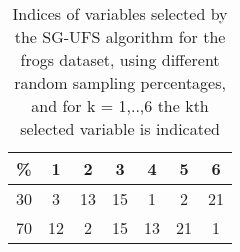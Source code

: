 \begin{table}
	\begin{center}
		\begin{tabular}{c c c c c c c}
			\% & 1 & 2 & 3 & 4 & 5 & 6 \\
			\hline
			30 & 3 & 13 & 15 & 1 & 2 & 21 \\
			70 & 12 & 2 & 15 & 13 & 21 & 1 \\
		\end{tabular}
	\end{center}
	\caption{Indices of variables selected by the SG-UFS algorithm for the frogs dataset, using different random sampling percentages, and for k = 1,..,6 the kth selected variable is indicated}
\end{table}